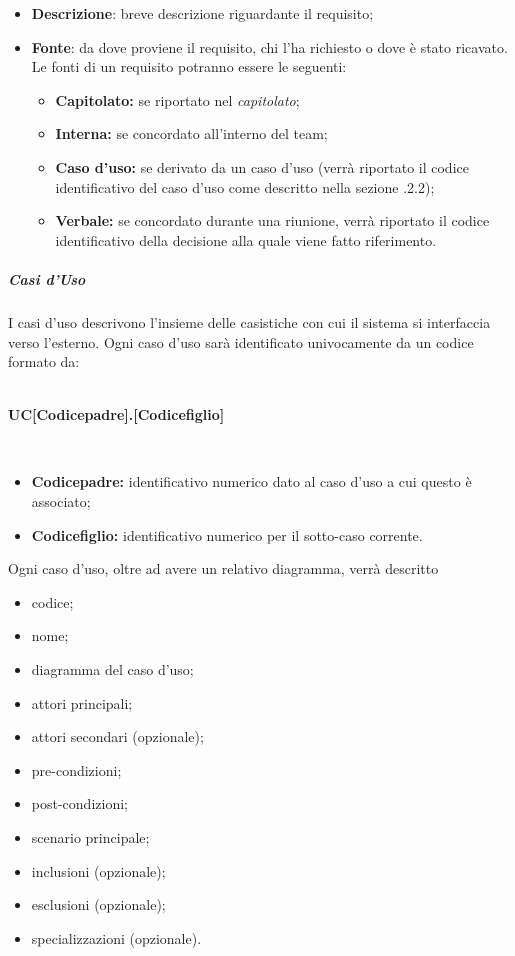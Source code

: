 \begin{itemize}
  \item \textbf{Descrizione}: breve descrizione riguardante il requisito;
  \item \textbf{Fonte}: da dove proviene il requisito, chi l'ha richiesto o dove è stato ricavato. Le fonti di un requisito potranno essere le seguenti:
  \begin{itemize}
  	\item \textbf{Capitolato\glos:} se riportato nel \textit{capitolato\glos};
  	\item \textbf{Interna:} se concordato all'interno del team;
  	\item \textbf{Caso d'uso:} se derivato da un caso d'uso (verrà riportato il codice identificativo del caso d'uso come descritto nella sezione .2.2);
  	\item \textbf{Verbale:} se concordato durante una riunione, verrà riportato il codice identificativo della decisione alla quale viene fatto riferimento.
  \end{itemize}
\end{itemize}

\subparagraph*{Casi d'Uso}
I casi d'uso descrivono l'insieme delle casistiche con cui il sistema si interfaccia verso l'esterno. Ogni caso d'uso sarà identificato univocamente da un codice formato da:
\\\\
\centerline{\textbf{UC[Codicepadre].[Codicefiglio]}}\\

\begin{itemize}
	\item \textbf{Codicepadre:} identificativo numerico dato al caso d'uso a cui questo è associato;
	\item \textbf{Codicefiglio:} identificativo numerico per il sotto-caso corrente.
\end{itemize}
Ogni caso d'uso, oltre ad avere un relativo diagramma, verrà descritto 
\begin{itemize}
  \item codice;
  \item nome;
  \item diagramma del caso d'uso;
  \item attori principali;
  \item attori secondari (opzionale);
  \item pre-condizioni;
  \item post-condizioni;
  \item scenario principale;
  \item inclusioni (opzionale);
  \item esclusioni (opzionale);
  \item specializzazioni (opzionale).
\end{itemize}


